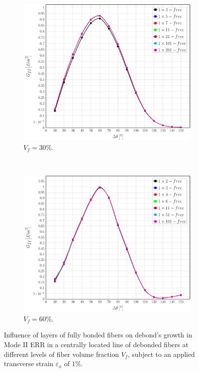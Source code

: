 \documentclass[review]{elsarticle}
\begin{document}
\begin{figure}[!h]
\centering
    \begin{subfigure}[b]{0.45\textwidth}
        \includegraphics[width=\textwidth]{abovefibers-vf30-GII.pdf}
        \caption{$V_{f}=30\%$.}\label{subfig:abovefiber30MII}
    \end{subfigure} ~
    \begin{subfigure}[b]{0.45\textwidth}
        \includegraphics[width=\textwidth]{abovefibers-vf60-GII.pdf}
        \caption{$V_{f}=60\%$.}\label{subfig:abovefiber60MII}
    \end{subfigure}

\caption{Influence of layers of fully bonded fibers on debond's growth in Mode II ERR in a centrally located line of debonded fibers at different levels of fiber volume fraction $V_{f}$, subject to an applied transverse strain $\varepsilon_{x}$ of $1\%$.}\label{fig:abovefibersMII}
\end{figure}
\end{document}
